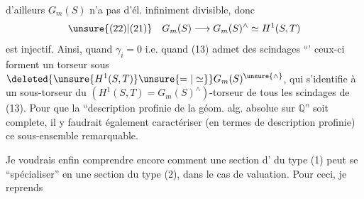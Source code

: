 d'ailleurs $G_m(S)$ n'a pas d'él. infiniment divisible, donc
\[
\unsure{(22)|(21)}\quad G_m(S)\longrightarrow G_m(S)^\wedge\simeq H^1(S,T)
\]
est injectif. Ainsi, quand $\gamma_i=0$ i.e. quand (13) admet des scindages ``'  ceux-ci forment un torseur sous $\deleted{\unsure{H^1(S,T)}\unsure{=|\simeq}}G_m(S)^{\unsure{\wedge}}$, qui s'identifie à un sous-torseur du $(H^1(S,T)=G_m(S)^\wedge)$-torseur de tous les scindages de (13). Pour que la ``description profinie de la géom. alg. absolue sur $\mathbb Q$'' soit complete, il y faudrait également caractériser (en termes de  description profinie) ce sous-ensemble remarquable.

Je voudrais enfin comprendre encore comment une section d' du type (1) peut se ``spécialiser'' en une section du type (2), dans le cas de  valuation. Pour ceci, je reprends
